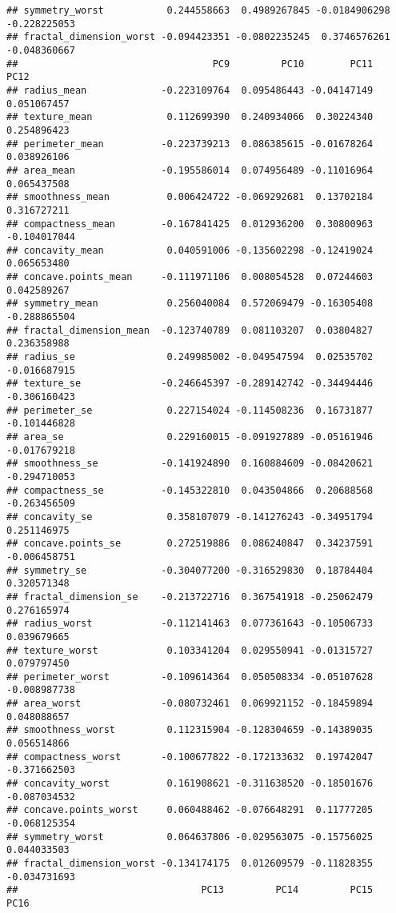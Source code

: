 \documentclass[
]{article}
\begin{document}
\begin{verbatim}
## symmetry_worst           0.244558663  0.4989267845 -0.0184906298 -0.228225053
## fractal_dimension_worst -0.094423351 -0.0802235245  0.3746576261 -0.048360667
##                                  PC9         PC10        PC11         PC12
## radius_mean             -0.223109764  0.095486443 -0.04147149  0.051067457
## texture_mean             0.112699390  0.240934066  0.30224340  0.254896423
## perimeter_mean          -0.223739213  0.086385615 -0.01678264  0.038926106
## area_mean               -0.195586014  0.074956489 -0.11016964  0.065437508
## smoothness_mean          0.006424722 -0.069292681  0.13702184  0.316727211
## compactness_mean        -0.167841425  0.012936200  0.30800963 -0.104017044
## concavity_mean           0.040591006 -0.135602298 -0.12419024  0.065653480
## concave.points_mean     -0.111971106  0.008054528  0.07244603  0.042589267
## symmetry_mean            0.256040084  0.572069479 -0.16305408 -0.288865504
## fractal_dimension_mean  -0.123740789  0.081103207  0.03804827  0.236358988
## radius_se                0.249985002 -0.049547594  0.02535702 -0.016687915
## texture_se              -0.246645397 -0.289142742 -0.34494446 -0.306160423
## perimeter_se             0.227154024 -0.114508236  0.16731877 -0.101446828
## area_se                  0.229160015 -0.091927889 -0.05161946 -0.017679218
## smoothness_se           -0.141924890  0.160884609 -0.08420621 -0.294710053
## compactness_se          -0.145322810  0.043504866  0.20688568 -0.263456509
## concavity_se             0.358107079 -0.141276243 -0.34951794  0.251146975
## concave.points_se        0.272519886  0.086240847  0.34237591 -0.006458751
## symmetry_se             -0.304077200 -0.316529830  0.18784404  0.320571348
## fractal_dimension_se    -0.213722716  0.367541918 -0.25062479  0.276165974
## radius_worst            -0.112141463  0.077361643 -0.10506733  0.039679665
## texture_worst            0.103341204  0.029550941 -0.01315727  0.079797450
## perimeter_worst         -0.109614364  0.050508334 -0.05107628 -0.008987738
## area_worst              -0.080732461  0.069921152 -0.18459894  0.048088657
## smoothness_worst         0.112315904 -0.128304659 -0.14389035  0.056514866
## compactness_worst       -0.100677822 -0.172133632  0.19742047 -0.371662503
## concavity_worst          0.161908621 -0.311638520 -0.18501676 -0.087034532
## concave.points_worst     0.060488462 -0.076648291  0.11777205 -0.068125354
## symmetry_worst           0.064637806 -0.029563075 -0.15756025  0.044033503
## fractal_dimension_worst -0.134174175  0.012609579 -0.11828355 -0.034731693
##                                PC13         PC14         PC15        PC16

\end{verbatim}
\end{document}
